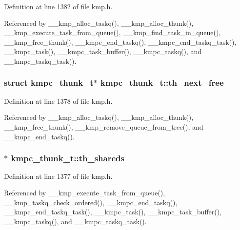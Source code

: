 Definition at line 1382 of file kmp.\-h.



Referenced by \-\_\-\-\_\-kmp\-\_\-alloc\-\_\-taskq(), \-\_\-\-\_\-kmp\-\_\-alloc\-\_\-thunk(), \-\_\-\-\_\-kmp\-\_\-execute\-\_\-task\-\_\-from\-\_\-queue(), \-\_\-\-\_\-kmp\-\_\-find\-\_\-task\-\_\-in\-\_\-queue(), \-\_\-\-\_\-kmp\-\_\-free\-\_\-thunk(), \-\_\-\-\_\-kmpc\-\_\-end\-\_\-taskq(), \-\_\-\-\_\-kmpc\-\_\-end\-\_\-taskq\-\_\-task(), \-\_\-\-\_\-kmpc\-\_\-task(), \-\_\-\-\_\-kmpc\-\_\-task\-\_\-buffer(), \-\_\-\-\_\-kmpc\-\_\-taskq(), and \-\_\-\-\_\-kmpc\-\_\-taskq\-\_\-task().

\hypertarget{structkmpc__thunk__t_a8afc990c7593d8046a2f07a2578281db}{
\subsubsection[{th\-\_\-next\-\_\-free}]{\setlength{\rightskip}{0pt plus 5cm}struct {\bf kmpc\-\_\-thunk\-\_\-t}$\ast$ kmpc\-\_\-thunk\-\_\-t\-::th\-\_\-next\-\_\-free}}\label{structkmpc__thunk__t_a8afc990c7593d8046a2f07a2578281db}


Definition at line 1378 of file kmp.\-h.



Referenced by \-\_\-\-\_\-kmp\-\_\-alloc\-\_\-taskq(), \-\_\-\-\_\-kmp\-\_\-alloc\-\_\-thunk(), \-\_\-\-\_\-kmp\-\_\-free\-\_\-thunk(), \-\_\-\-\_\-kmp\-\_\-remove\-\_\-queue\-\_\-from\-\_\-tree(), and \-\_\-\-\_\-kmpc\-\_\-end\-\_\-taskq().

\hypertarget{structkmpc__thunk__t_a481b82a1c9aeb8d9141a04e5d1895147}{
\subsubsection[{th\-\_\-shareds}]{$\ast$ kmpc\-\_\-thunk\-\_\-t\-::th\-\_\-shareds}}\label{structkmpc__thunk__t_a481b82a1c9aeb8d9141a04e5d1895147}


Definition at line 1377 of file kmp.\-h.



Referenced by \-\_\-\-\_\-kmp\-\_\-execute\-\_\-task\-\_\-from\-\_\-queue(), \-\_\-\-\_\-kmp\-\_\-taskq\-\_\-check\-\_\-ordered(), \-\_\-\-\_\-kmpc\-\_\-end\-\_\-taskq(), \-\_\-\-\_\-kmpc\-\_\-end\-\_\-taskq\-\_\-task(), \-\_\-\-\_\-kmpc\-\_\-task(), \-\_\-\-\_\-kmpc\-\_\-task\-\_\-buffer(), \-\_\-\-\_\-kmpc\-\_\-taskq(), and \-\_\-\-\_\-kmpc\-\_\-taskq\-\_\-task().

